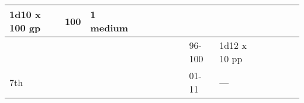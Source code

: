 \begin{longtable}{llllllllllllll}
{\begin{minipage}[t]{0.469in}
1d10 x 100 gp\end{minipage}} & \multicolumn{1}{p{0.923in}|}{\begin{minipage}[t]{0.923in}\raggedright
100\end{minipage}} & \multicolumn{1}{p{0.469in}|}{\begin{minipage}[t]{0.469in}\raggedright
1 medium\end{minipage}} & \multicolumn{1}{p{0.626in}|}{\begin{minipage}[t]{0.626in}\raggedright
\end{minipage}} & \multicolumn{1}{p{0.469in}|}{\begin{minipage}[t]{0.469in}\centering
\end{minipage}}\\
\hline
\multicolumn{8}{p{1.150in}|}{\begin{minipage}[t]{1.150in}\centering
\end{minipage}} & \multicolumn{1}{|p{0.393in}|}{\begin{minipage}[t]{0.393in}\raggedright
96-100\end{minipage}} & \multicolumn{1}{p{0.469in}|}{\begin{minipage}[t]{0.469in}\raggedright
1d12 x 10 pp\end{minipage}} & \multicolumn{1}{p{0.923in}|}{\begin{minipage}[t]{0.923in}\raggedright
\end{minipage}} & \multicolumn{1}{p{0.469in}|}{\begin{minipage}[t]{0.469in}\raggedright
\end{minipage}} & \multicolumn{1}{p{0.626in}|}{\begin{minipage}[t]{0.626in}\raggedright
\end{minipage}} & \multicolumn{1}{p{0.469in}|}{\begin{minipage}[t]{0.469in}\centering
\end{minipage}}\\
\hline
\multicolumn{8}{p{1.150in}|}{\begin{minipage}[t]{1.150in}\centering
7th\end{minipage}} & \multicolumn{1}{|p{0.393in}|}{\begin{minipage}[t]{0.393in}\raggedright
01-11\end{minipage}} & \multicolumn{1}{p{0.469in}|}{\begin{minipage}[t]{0.469in}\raggedright
---\end{minipage}} & \multicolumn{1}{p{0.923in}|}{\begin{minipage}[t]{0.923in}\raggedright

\end{minipage}}
\end{longtable}
